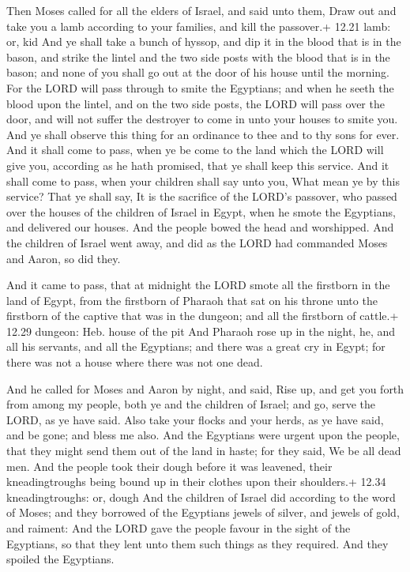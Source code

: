  Then Moses called for all the elders of Israel, and said
unto them, Draw out and take you a lamb according to your families, and
kill the passover.+ 12.21 lamb: or, kid  And ye shall take
a bunch of hyssop, and dip it in the blood that is in the bason, and
strike the lintel and the two side posts with the blood that is in the
bason; and none of you shall go out at the door of his house until the
morning.  For the LORD will pass through to smite the
Egyptians; and when he seeth the blood upon the lintel, and on the two
side posts, the LORD will pass over the door, and will not suffer the
destroyer to come in unto your houses to smite you.  And ye
shall observe this thing for an ordinance to thee and to thy sons for
ever.  And it shall come to pass, when ye be come to the
land which the LORD will give you, according as he hath promised, that
ye shall keep this service.  And it shall come to pass,
when your children shall say unto you, What mean ye by this service?
 That ye shall say, It is the sacrifice of the LORD's
passover, who passed over the houses of the children of Israel in Egypt,
when he smote the Egyptians, and delivered our houses. And the people
bowed the head and worshipped.  And the children of Israel
went away, and did as the LORD had commanded Moses and Aaron, so did
they.

 And it came to pass, that at midnight the LORD smote all
the firstborn in the land of Egypt, from the firstborn of Pharaoh that
sat on his throne unto the firstborn of the captive that was in the
dungeon; and all the firstborn of cattle.+ 12.29 dungeon: Heb. house of
the pit  And Pharaoh rose up in the night, he, and all his
servants, and all the Egyptians; and there was a great cry in Egypt; for
there was not a house where there was not one dead.

 And he called for Moses and Aaron by night, and said,
Rise up, and get you forth from among my people, both ye and the
children of Israel; and go, serve the LORD, as ye have said.
 Also take your flocks and your herds, as ye have said, and
be gone; and bless me also.  And the Egyptians were urgent
upon the people, that they might send them out of the land in haste; for
they said, We be all dead men.  And the people took their
dough before it was leavened, their kneadingtroughs being bound up in
their clothes upon their shoulders.+ 12.34 kneadingtroughs: or, dough
 And the children of Israel did according to the word of
Moses; and they borrowed of the Egyptians jewels of silver, and jewels
of gold, and raiment:  And the LORD gave the people favour
in the sight of the Egyptians, so that they lent unto them such things
as they required. And they spoiled the Egyptians.

